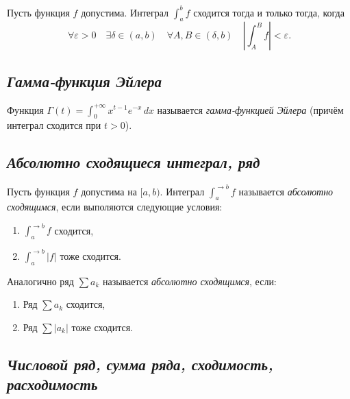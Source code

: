 \begin{theorem} \hypertarget{Критерий Больцано -- Коши сходимости несобственного интеграла}{}
	Пусть функция \(f\) допустима. Интеграл \(\int_a^b f\) сходится тогда и только тогда, когда \[
		\forall \varepsilon > 0 \quad \exists \delta \in (a, b) \quad \forall A, B \in (\delta, b) \quad \left|\int_A^B f \right| < \varepsilon.
	\]
\end{theorem}

\subsection{\itshape Гамма-функция Эйлера}

\begin{definition}
	Функция \(\displaystyle \Gamma(t) = \int_{0}^{+\infty} x^{t - 1} e^{-x} \, dx\) называется \textit{гамма-функцией Эйлера} (причём интеграл сходится при \(t > 0\)).
\end{definition}

\subsection{\itshape Абсолютно сходящиеся интеграл, ряд}

\begin{ndefinition}
	Пусть функция \(f\) допустима на \([a, b)\). Интеграл \(\int_{a}^{\to b} f\) называется \textit{абсолютно сходящимся}, если выполяются следующие условия:
	\begin{enumerate}
		\item \(\int_{a}^{\to b} f\) сходится,
		\item \(\int_{a}^{\to b} |f|\) тоже сходится.
	\end{enumerate}
\end{ndefinition}

\begin{ndefinition}
	Аналогично ряд \(\sum a_k\) называется \textit{абсолютно сходящимся}, если:
	\begin{enumerate}
		\item Ряд \(\sum a_k\) сходится,
		\item Ряд \(\sum |a_k|\) тоже сходится.
	\end{enumerate}
\end{ndefinition}

\subsection{\itshape Числовой ряд, сумма ряда, сходимость, расходимость}

